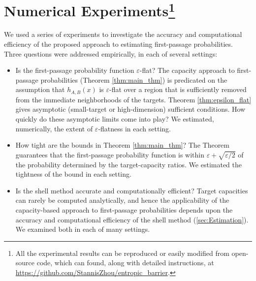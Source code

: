\documentclass[12pt, nofootinbib,english, amsmath, amssymb, aps, priprint, graphicx,floatfix]{revtex4-1}
\newcommand{\theepsrate}{\varepsilon + \sqrt{\varepsilon/2}}
\theoremstyle{plain}
\theoremstyle{definition}
\theoremstyle{plain}
\begin{document}

                                                                               


\section{Numerical Experiments\footnote{All the experimental results can be reproduced or easily modified from open-source code, which can found, along with detailed instructions, at \url{https://github.com/StannisZhou/entropic_barrier}.}}\label{sec:Experiments}
We used a series of experiments to investigate 
the accuracy and computational efficiency of the proposed
approach to estimating first-passage probabilities. Three 
questions were addressed empirically, in each of several settings:

\begin{itemize}

\item Is the first-passage probability function 
 $\varepsilon$-flat?  
The capacity approach to first-passage probabilities (Theorem  \ref{thm:main_thm}) is predicated on the assumption that 
$h_{A,B}(x)$ is $\varepsilon$-flat over a region that is sufficiently removed from the immediate neighborhoods of the targets.
Theorem \ref{thm:epsilon_flat} gives asymptotic (small-target or high-dimension) sufficient conditions. How quickly do these asymptotic limits come into play?  We estimated, numerically, the extent of $\varepsilon$-flatness in each setting. 
	
\item How tight are the bounds in Theorem \ref{thm:main_thm}?  The Theorem guarantees that the first-passage probability function is within $\theepsrate$ of the probability determined by the target-capacity ratios.  We estimated the tightness of the bound in each setting. 

\item Is the shell method accurate and computationally efficient?  
Target capacities can rarely be computed analytically, and hence the applicability of the capacity-based approach to first-passage probabilities depends upon the accuracy and computational efficiency of the shell method (\ref{sec:Estimation}).  We examined both in each of many settings. 
\end{itemize}
\end{document}

